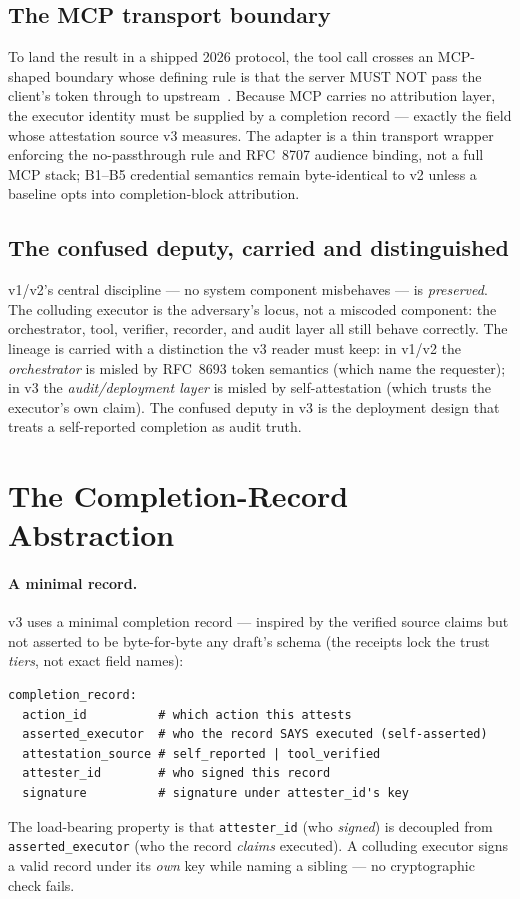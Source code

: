 \documentclass[11pt]{article}
\newcommand{\code}[1]{\texttt{#1}}
\newcommand{\asexec}{\code{asserted\_executor}}
\begin{document}
\subsection{The MCP transport boundary}
To land the result in a shipped 2026 protocol, the tool call crosses an
MCP-shaped boundary whose defining rule is that the server MUST NOT pass the
client's token through to upstream~\cite{mcp}. Because MCP carries no attribution
layer, the executor identity must be supplied by a completion record --- exactly
the field whose attestation source v3 measures. The adapter is a thin transport
wrapper enforcing the no-passthrough rule and RFC~8707 audience binding, not a
full MCP stack; B1--B5 credential semantics remain byte-identical to v2 unless a
baseline opts into completion-block attribution.

\subsection{The confused deputy, carried and distinguished}
v1/v2's central discipline --- no system component misbehaves --- is
\emph{preserved}. The colluding executor is the adversary's locus, not a miscoded
component: the orchestrator, tool, verifier, recorder, and audit layer all still
behave correctly. The lineage is carried with a distinction the v3 reader must
keep: in v1/v2 the \emph{orchestrator} is misled by RFC~8693 token semantics
(which name the requester); in v3 the \emph{audit/deployment layer} is misled by
self-attestation (which trusts the executor's own claim). The confused deputy in
v3 is the deployment design that treats a self-reported completion as audit
truth.

\section{The Completion-Record Abstraction}
\label{sec:record}

\paragraph{A minimal record.}
v3 uses a minimal completion record --- inspired by the verified source claims but
not asserted to be byte-for-byte any draft's schema (the receipts lock the trust
\emph{tiers}, not exact field names):
\begin{lstlisting}
completion_record:
  action_id          # which action this attests
  asserted_executor  # who the record SAYS executed (self-asserted)
  attestation_source # self_reported | tool_verified
  attester_id        # who signed this record
  signature          # signature under attester_id's key
\end{lstlisting}
The load-bearing property is that \code{attester\_id} (who \emph{signed}) is
decoupled from \asexec{} (who the record \emph{claims} executed). A colluding
executor signs a valid record under its \emph{own} key while naming a sibling ---
no cryptographic check fails.
\end{document}
